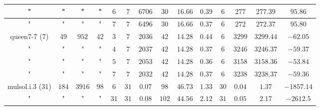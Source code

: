 \documentclass{beamer}
\begin{document}
{\begin{defi}
\begin{table}[H]
\begin{center}
\begin{tabular}{|c|c|c|c|c|c|c|c|c|c|c|c|c|c|}
\hline
{\small "} & {\small "} & {\small "} & {\small "} & {\small $6$} & {\small $7$} & {\small $6706$} & {\small $30$}  & {\small $16.66$} & {\small $0.39$} & {\small $6$} & {\small $277$} & {\small $277.39$} & {\small $95.86$}\\
\hline
{\small "} & {\small "} & {\small "} & {\small "} & {\small $7$} & {\small $7$} & {\small $6496$} & {\small $30$}  & {\small $16.66$} & {\small $0.37$} & {\small $6$} & {\small $272$} & {\small $272.37$} & {\small $95.80$}\\
\hline
\hline
{\small queen7-7 (7)} & {\small $49$} & {\small $952$} & {\small $42$} & {\small $3$} & {\small $7$} & {\small $2036$} & {\small $42$} & {\small $14.28$} & {\small $0.44$} & {\small $6$} & {\small $3299$} & {\small $3299.44$} & {\small $-62.05$}\\
\hline
{\small "} & {\small "} & {\small "} & {\small "} & {\small $4$} & {\small $7$} & {\small $2037$} & {\small $42$}  & {\small $14.28$} & {\small $0.37$} & {\small $6$} & {\small $3246$} & {\small $3246.37$} & {\small $-59.37$}\\
\hline
{\small "} & {\small "} & {\small "} & {\small "} & {\small $5$} & {\small $7$} & {\small $2053$} & {\small $42$}  & {\small $14.28$} & {\small $0.36$} & {\small $6$} & {\small $3158$} & {\small $3158.36$} & {\small $-53.84$}\\
\hline
{\small "} & {\small "} & {\small "} & {\small "} & {\small $7$} & {\small $7$} & {\small $2032$} & {\small $42$} & {\small $14.28$} & {\small $0.37$} & {\small $6$} & {\small $3238$} & {\small $3238.37$} & {\small $-59.36$}\\
\hline
\hline
{\small mulsol.i.3 (31)} & {\small $184$} & {\small $3916$} & {\small $98$} & {\small $6$} & {\small $31$} & {\small $0.07$} & {\small $98$} & {\small $46.73$} & {\small $1.33$} & {\small $30$} & {\small $0.04$} & {\small $1.37$} & {\small $-1857.14$}\\
\hline
{\small "} & {\small "} & {\small "} & {\small "} & {\small $31$} & {\small $31$} & {\small $0.08$} & {\small $102$} & {\small $44.56$} & {\small $2.12$} & {\small $31$} & {\small $0.05$} & {\small $2.17$} & {\small $-2612.5$}\\

\end{tabular}
\end{center}
\end{table}
\end{defi}}
\end{document}
